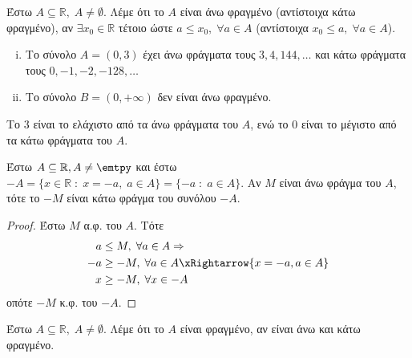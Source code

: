 \documentclass[main.tex]{subfiles}
\begin{document}
 \begin{dfn}
     Έστω $ A \subseteq \mathbb{R}, \; A \neq \emptyset $. Λέμε ότι το 
     $A$ είναι άνω φραγμένο (αντίστοιχα κάτω φραγμένο), αν $ 
     \exists x_{0} \in \mathbb{R}$ τέτοιο ώστε $ a \leq x_{0}, \; 
     \forall a \in A$ (αντίστοιχα $ x_{0} \leq a, \; \forall a \in A $).
 \end{dfn}

 \begin{example}
 \item {}
     \begin{enumerate}[i)]
         \item Το  σύνολο $ A = (0,3) $  έχει άνω φράγματα τους $ 3, 4, 144, 
             \ldots$ και κάτω φράγματα τους $ 0, -1, -2, -128, \ldots $ 

         \item Το σύνολο $ B = (0,+\infty) $ δεν είναι άνω φραγμένο.
     \end{enumerate}
 \end{example}

 \begin{rem}
     Το  $ 3 $ είναι το ελάχιστο από τα άνω φράγματα του $A$, ενώ το $ 0
     $ είναι το μέγιστο από τα κάτω φράγματα του $A$. 
 \end{rem}

 \begin{prop}
     Έστω $ A \subseteq \mathbb{R}, A \neq \emtpy $ και έστω 
     $ -A = \{ x \in \mathbb{R} \; : \; x = -a, \; a \in A \} = \{ 
     -a \; : \; a \in A\} $. Αν $M$ είναι άνω φράγμα 
     του $A$, τότε το $ -M $ είναι κάτω φράγμα του συνόλου $ -A $.
 \end{prop}

 \begin{proof}
   Έστω $M$ α.φ. του $A$. Τότε 
   \begin{align*}
       a &\leq M, \; \forall a \in A \Rightarrow  \\
       -a &\geq -M, \; \forall a \in A \xRightarrow{x= -a, a \in A} \\
       x &\geq -M, \; \forall x \in -A
   \end{align*}
 οπότε $ -M $  κ.φ. του $ -A $.
 \end{proof}

 \begin{dfn}
     Έστω $ A \subseteq \mathbb{R}, \; A \neq \emptyset $. Λέμε ότι το $A$ 
     είναι φραγμένο, αν είναι άνω και κάτω φραγμένο. 
 \end{dfn}
\end{document}
